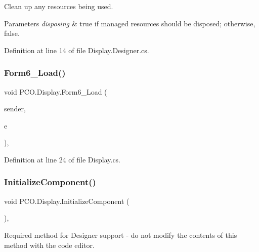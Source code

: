 Clean up any resources being used. 


\begin{DoxyParams}{Parameters}
{\em disposing} & true if managed resources should be disposed; otherwise, false.\\
\hline
\end{DoxyParams}


Definition at line 14 of file Display.\+Designer.\+cs.

\mbox{\label{classPCO_1_1Display_aa744041d0020314937c76b8d6cf57f18}} 
\subsubsection{\texorpdfstring{Form6\+\_\+\+Load()}{Form6\_Load()}}
{\footnotesize\ttfamily void P\+C\+O.\+Display.\+Form6\+\_\+\+Load (\begin{DoxyParamCaption}\item[{object}]{sender,  }\item[{Event\+Args}]{e }\end{DoxyParamCaption})\hspace{0.3cm}{\ttfamily [inline]}, {\ttfamily [private]}}



Definition at line 24 of file Display.\+cs.

\mbox{\label{classPCO_1_1Display_a6021b12cbb622cd9dde67e4f68d9dfb7}} 
\subsubsection{\texorpdfstring{Initialize\+Component()}{InitializeComponent()}}
{\footnotesize\ttfamily void P\+C\+O.\+Display.\+Initialize\+Component (\begin{DoxyParamCaption}{ }\end{DoxyParamCaption})\hspace{0.3cm}{\ttfamily [inline]}, {\ttfamily [private]}}



Required method for Designer support -\/ do not modify the contents of this method with the code editor. 



